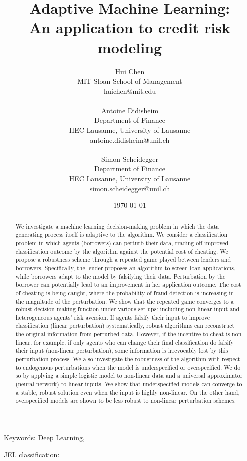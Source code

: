 \documentclass[12pt]{article} %
\title{Adaptive Machine Learning:\\
An application to credit risk modeling}
\author{
Hui Chen\\
MIT Sloan School of Management\\
huichen@mit.edu\\
\mbox{}\\
Antoine Didisheim\\
Department of Finance \\
HEC Lausanne, University of Lausanne\\
antoine.didisheim@unil.ch\\
\mbox{}\\
Simon Scheidegger \\
Department of Finance \\
HEC Lausanne, University of Lausanne\\
simon.scheidegger@unil.ch\\
}
\date{\vspace{0.5cm} \today
}
\begin{document}
\maketitle

\newpage

\begin{abstract}

We investigate a machine learning decision-making problem in which the data generating process itself is adaptive to the algorithm.
We consider a classification problem in which agents (borrowers) can perturb their data, trading off improved classification outcome
by the algorithm against the potential cost of cheating.
We propose a robustness scheme through a repeated game played between lenders and borrowers.
Specifically, the lender proposes an algorithm to screen loan applications, while borrowers adapt to the model by falsifying their data.
Perturbation by the borrower can potentially lead to an improvement in her application outcome.
The cost of cheating is being caught, where the probability of fraud detection is increasing in the magnitude of the perturbation.
We show that the repeated game converges to a robust decision-making function under various set-ups:
including non-linear input and heterogeneous agents' risk aversion. If agents falsify their input to improve classification (linear perturbation) systematically, robust algorithms can reconstruct the original information from perturbed data. However, if the incentive to cheat is non-linear, for example, if only agents who can change their final classification do falsify their input (non-linear perturbation), some information is irrevocably lost by this perturbation process.
We also investigate the robustness of the algorithm with respect to endogenous perturbations when the model is underspecified or overspecified. We do so by applying a simple logistic model to non-linear data and a universal approximator (neural network) to linear inputs. We show that underspecified models can converge to a stable, robust solution even when the input is highly non-linear. On the other hand, overspecified models are shown to be less robust to non-linear perturbation schemes.

\end{abstract}

\noindent Keywords: Deep Learning, 

\medskip
\noindent JEL classification: 


\newpage
\end{document}
